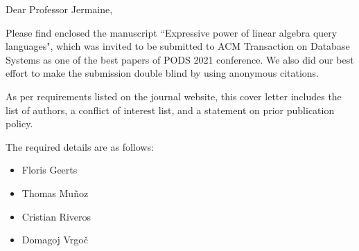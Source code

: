 \documentclass[11pt]{letter}
\begin{document}
\thispagestyle{empty}



Dear Professor Jermaine,



\vspace*{1cm}



Please find enclosed the manuscript ``Expressive power of linear algebra query languages", which was invited to be submitted to ACM Transaction on Database Systems as one of the best papers of PODS 2021 conference. %
We also did our best effort to make the submission double blind by using anonymous citations.


As per requirements listed on the journal website, this cover letter includes the list of authors, a conflict of interest list, and a statement on prior publication policy.


The required details are as follows:

\begin{itemize}\itemsep=-1pt
\item Floris Geerts
\item Thomas Mu\~noz
\item Cristian Riveros
\item Domagoj Vrgo\v{c}
\end{itemize}

%

\medskip
\end{document}
